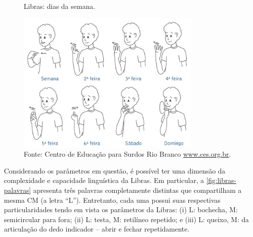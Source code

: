 \begin{figure}[htbp]
\caption{Libras: dias da semana.}
\label{fig:libras-dias-semana}
\centerline{\includegraphics[width=0.8\textwidth]{images/libras-dias-semana.jpg}}
\caption*{Fonte: Centro de Educação para Surdos Rio Branco \url{www.ces.org.br}.}
\end{figure}

Considerando os parâmetros em questão, é possível ter uma dimensão da complexidade e capacidade linguística da Libras. Em particular, a \autoref{fig:libras-palavras} apresenta três palavras completamente distintas que compartilham a mesma CM (a letra ``L''). Entretanto, cada uma possui suas respectivas particularidades tendo em vista os parâmetros da Libras: (i) L: bochecha, M: semicircular para fora; (ii) L: testa, M: retilíneo repetido; e (iii) L: queixo, M: da articulação do dedo indicador -- abrir e fechar repetidamente.

